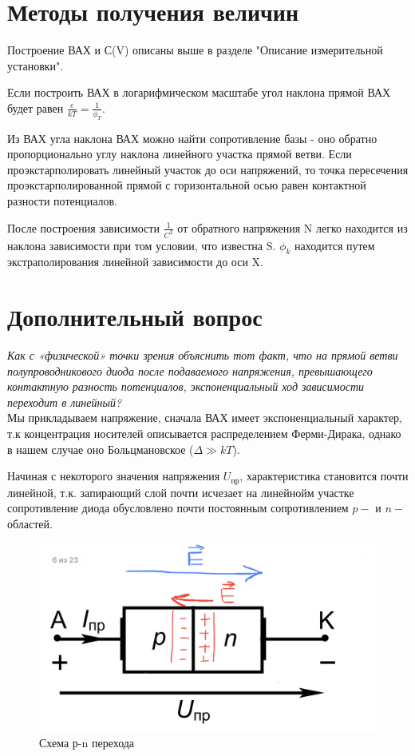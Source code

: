 \documentclass[a4paper]{article}
\begin{document}
\section{Методы получения величин}
Построение ВАХ и С(V) описаны выше в разделе "Описание измерительной установки".

Если построить ВАХ в логарифмическом масштабе угол наклона прямой ВАХ будет равен $\frac{e}{kT} = \frac{1}{\phi_T}$.

Из ВАХ угла наклона ВАХ можно найти сопротивление базы - оно обратно пропорционально углу наклона линейного участка прямой ветви. Если проэкстарполировать линейный участок до оси напряжений, то точка пересечения проэкстарполированной прямой с горизонтальной осью равен контактной разности потенциалов.

После построения зависимости $\frac{1}{C^2}$ от обратного напряжения N легко находится из наклона зависимости при том условии, что известна S. $\phi_{k}$ находится путем экстраполирования линейной зависимости до оси X. 

\section{Дополнительный вопрос}
\textit{Как с «физической» точки зрения объяснить тот факт, что на прямой ветви полупроводникового диода после подаваемого напряжения, превышающего контактную разность потенциалов, экспоненциальный ход зависимости переходит в линейный?}\\


Мы прикладываем напряжение, сначала ВАХ имеет экспоненциальный характер, т.к концентрация носителей описывается распределением Ферми-Дирака, однако в нашем случае оно Больцмановское ($\Delta \gg kT$). \par 
Начиная с некоторого значения напряжения $U_{пр}$, характеристика становится почти линейной, т.к. запирающий слой почти исчезает на линейнойм участке сопротивление диода обусловлено почти постоянным сопротивлением $p-$ и $n-$областей.
\begin{figure}[h!]
    \centering
    \includegraphics[scale=0.2]{IMG_3733.jpg}
    \caption{Схема р-n перехода}
    \label{fig:quest}
\end{figure}
\end{document}
